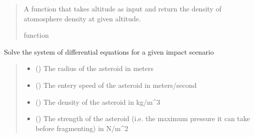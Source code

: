 \documentclass[letterpaper,10pt,english]{sphinxmanual}
\begin{document}
\begin{fulllineitems}
\begin{fulllineitems}
\begin{quote}
\begin{description}
\sphinxAtStartPar
{} \textendash{} A function that takes altitude as input and return the density of
atomosphere density at given altitude.

\sphinxAtStartPar
function

\end{description}\end{quote}

\end{fulllineitems}


\begin{fulllineitems}
\label{\detokenize{index:solver.Planet.solve_atmospheric_entry}}
\pysigstartsignatures
{}
\pysigstopsignatures
\sphinxAtStartPar
Solve the system of differential equations for a given impact scenario
\begin{quote}\begin{description}
\begin{itemize}
\item {} 
\sphinxAtStartPar
{} () \textendash{} The radius of the asteroid in meters

\item {} 
\sphinxAtStartPar
{} () \textendash{} The entery speed of the asteroid in meters/second

\item {} 
\sphinxAtStartPar
{} () \textendash{} The density of the asteroid in kg/m\textasciicircum{}3

\item {} 
\sphinxAtStartPar
{} () \textendash{} The strength of the asteroid (i.e. the maximum pressure it can
take before fragmenting) in N/m\textasciicircum{}2


\end{itemize}
\end{description}
\end{quote}
\end{fulllineitems}
\end{fulllineitems}
\end{document}
